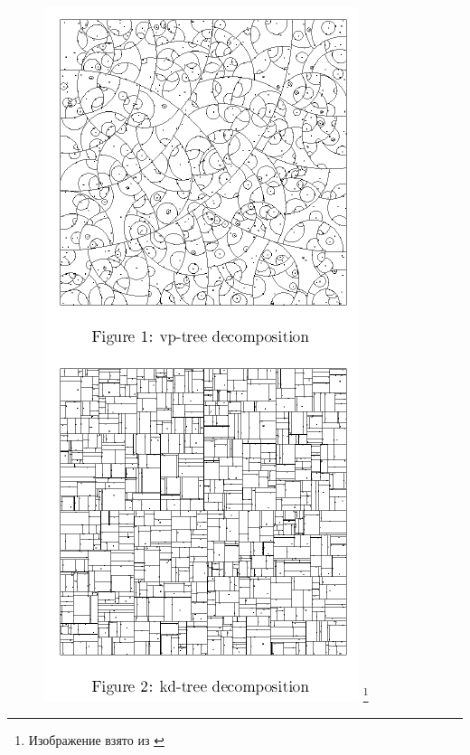 \documentclass{beamer}
\begin{document}
\begin{frame}
\begin{multicols}{2}
\begin{figure}[htb]
	\includegraphics[width=\textwidth,height=0.8\textheight,keepaspectratio]{vp-tree.png} 
	\footnote{\tiny{Изображение взято из \cite{Yianilos1993}}}
\end{figure}

\end{multicols}

\end{frame}
\end{document}
